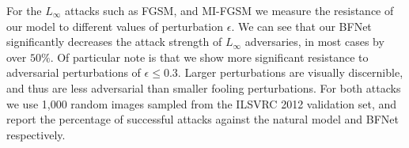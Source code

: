\documentclass{article} %
\begin{document}
For the $L_\infty$ attacks such as FGSM, and MI-FGSM we measure the resistance of our model to different values of perturbation $\epsilon$. We can see that our BFNet significantly decreases the attack strength of $L_\infty$ adversaries, in most cases by over $50\%$. Of particular note is that we show more significant resistance to adversarial perturbations of $\epsilon \leq 0.3$. Larger perturbations are visually discernible, and thus are less adversarial than smaller fooling perturbations. For both attacks we use 1,000 random images sampled from the ILSVRC 2012 validation set, and report the percentage of successful attacks against the natural model and BFNet respectively.
\end{document}
